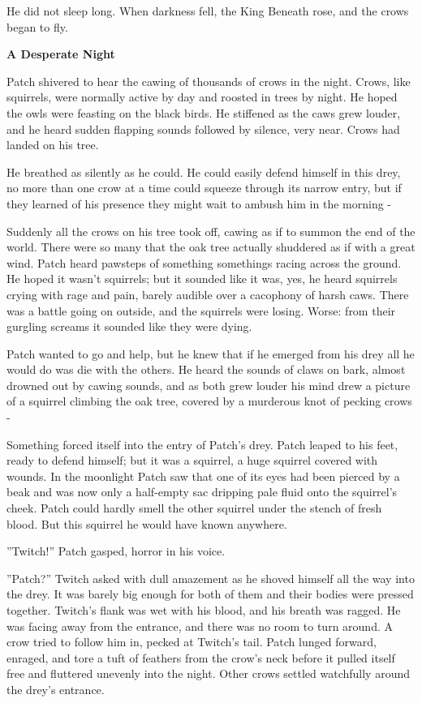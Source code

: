 \documentclass[11pt]{article}
\begin{document}
 He did not sleep long. When darkness fell, the King Beneath rose, and the crows began to fly.\par
\par
{\bf A Desperate Night\par
}\par
 Patch shivered to hear the cawing of thousands of crows in the night. Crows, like squirrels, were normally active by day and roosted in trees by night. He hoped the owls were feasting on the black birds. He stiffened as the caws grew louder, and he heard sudden flapping sounds followed by silence, very near. Crows had landed on his tree.\par
He breathed as silently as he could. He could easily defend himself in this drey, no more than one crow at a time could squeeze through its narrow entry, but if they learned of his presence they might wait to ambush him in the morning -\par
 Suddenly all the crows on his tree took off, cawing as if to summon the end of the world. There were so many that the oak tree actually shuddered as if with a great wind. Patch heard pawsteps of something %
 somethings %
 racing across the ground. He hoped it wasn't squirrels; but it sounded like it was, yes, he heard squirrels crying with rage and pain, barely audible over a cacophony of harsh caws. There was a battle going on outside, and the squirrels were losing. Worse: from their gurgling screams it sounded like they were dying.\par
Patch wanted to go and help, but he knew that if he emerged from his drey all he would do was die with the others. He heard the sounds of claws on bark, almost drowned out by cawing sounds, and as both grew louder his mind drew a picture of a squirrel climbing the oak tree, covered by a murderous knot of pecking crows -\par
 Something forced itself into the entry of Patch's drey. Patch leaped to his feet, ready to defend himself; but it was a squirrel, a huge squirrel covered with wounds. In the moonlight Patch saw that one of its eyes had been pierced by a beak and was now only a half-empty sac dripping pale fluid onto the squirrel's cheek. Patch could hardly smell the other squirrel under the stench of fresh blood. But this squirrel he would have known anywhere.\par
 ''Twitch!'' Patch gasped, horror in his voice.\par
 ''Patch?'' Twitch asked with dull amazement as he shoved himself all the way into the drey. It was barely big enough for both of them and their bodies were pressed together. Twitch's flank was wet with his blood, and his breath was ragged. He was facing away from the entrance, and there was no room to turn around. A crow tried to follow him in, pecked at Twitch's tail. Patch lunged forward, enraged, and tore a tuft of feathers from the crow's neck before it pulled itself free and fluttered unevenly into the night. Other crows settled watchfully around the drey's entrance.\par
\end{document}
